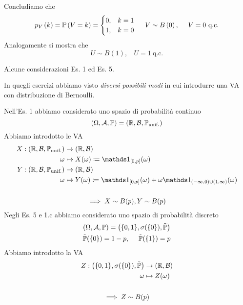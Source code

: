 \begin{enumerate}
Concludiamo che
\begin{equation*}
p_{V}\left(k\right) =\mathbb{P}\left(V=k\right) =
\begin{cases}
0, & k=1\\
1, & k=0
\end{cases}
 \ \ \ \ V\sim B\left(0\right) ,\ \ \ \ V=0\ \text{q.c.}
\end{equation*}
Analogamente si mostra che
\begin{equation*}
U\sim B(1) ,\ \ \ \ U=1\ \text{q.c.}
\end{equation*}
\end{enumerate}
\begin{oss}
Alcune considerazioni Es. 1 ed Es. 5.

In quegli esercizi abbiamo visto \textit{diversi possibili modi} in cui introdurre una VA con distribuzione di Bernoulli.

Nell'Es. 1 abbiamo considerato uno spazio di probabilità continuo
\begin{equation*}
(\Omega ,\mathcal{A} ,\mathbb{P}) =(\mathbb{R} ,\mathcal{B} ,\mathbb{P}_{\text{unif.}})
\end{equation*}
Abbiamo introdotto le VA
\begin{gather*}
\begin{aligned}
X:(\mathbb{R} ,\mathcal{B} ,\PP_{\text{unif.}}) & \rightarrow (\mathbb{R} ,\mathcal{B})\\
\omega  & \mapsto X(\omega) \coloneqq \Ind_{[0,p]}(\omega)\\
Y:(\mathbb{R} ,\mathcal{B} ,\PP_{\text{unif.}}) & \rightarrow (\mathbb{R} ,\mathcal{B})\\
\omega  & \mapsto Y(\omega) \coloneqq \Ind_{[0,p]}(\omega) +\omega \Ind_{(-\infty ,0) \cup (1,\infty)}(\omega)
\end{aligned}\\
\ \\
\implies X\sim B(p) ,Y\sim B(p)
\end{gather*}
Negli Es. 5 e 1.c abbiamo considerato uno spazio di probabilità discreto
\begin{gather*}
(\Omega ,\mathcal{A} ,\mathbb{P}) =\left(\{0,1\} ,\sigma (\{0\}) ,\tilde{\mathbb{P}}\right)\\
\tilde{\mathbb{P}}(\{0\}) =1-p,\ \ \ \ \tilde{\mathbb{P}}(\{1\}) =p
\end{gather*}
Abbiamo introdotto la VA
\begin{gather*}
\begin{aligned}
Z:\left(\{0,1\} ,\sigma (\{0\}) ,\tilde{\mathbb{P}}\right) & \rightarrow (\mathbb{R} ,\mathcal{B})\\
\omega  & \mapsto Z(\omega)
\end{aligned}\\
\\
\implies Z\sim B(p)
\end{gather*}
\end{oss}

